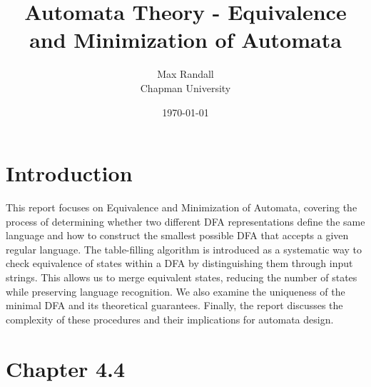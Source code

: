 \documentclass{article}
\title{Automata Theory - Equivalence and Minimization of Automata}
\author{Max Randall \\ Chapman University}
\date{\today}
\theoremstyle{theorem}
\theoremstyle{definition}
\theoremstyle{remark}
\begin{document}
\maketitle

\setcounter{tocdepth}{3}
\tableofcontents

\newpage
\section{Introduction}\label{sec:intro}
This report focuses on Equivalence and Minimization of Automata, covering the process of determining whether two different DFA representations define the same language and how to construct the smallest possible DFA that accepts a given regular language. The table-filling algorithm is introduced as a systematic way to check equivalence of states within a DFA by distinguishing them through input strings. This allows us to merge equivalent states, reducing the number of states while preserving language recognition. We also examine the uniqueness of the minimal DFA and its theoretical guarantees. Finally, the report discusses the complexity of these procedures and their implications for automata design.

\newpage
\section{Chapter 4.4}
\end{document}
